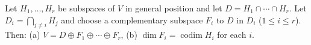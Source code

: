 Let $H_1, \ldots, H_r$ be subspaces of $V$ in general position and let $D = H_1 \cap \cdots \cap H_r$. Let $D_i = \bigcap_{j \neq i} H_j$ and choose a complementary subspace $F_i$ to $D$ in $D_i$ ($1 \leq i \leq r$). Then:
(a) $V = D \oplus F_1 \oplus \cdots \oplus F_r$,
(b) $\dim F_i = \operatorname{codim} H_i$ for each $i$.
